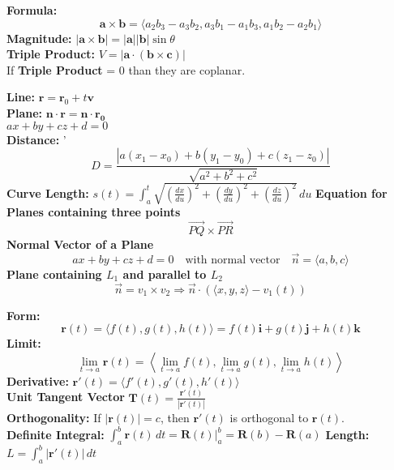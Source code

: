 \documentclass[2pt]{article}
\begin{document}
\begin{multicols}{2}
\begin{tcolorbox}[title=\textbf{Cross Product}, colframe=lightyellow]
\textbf{Formula:}
\[ \mathbf{a} \times \mathbf{b} = \langle a_2b_3 - a_3b_2, a_3b_1 - a_1b_3, a_1b_2 - a_2b_1 \rangle \] 
\textbf{Magnitude:} $|\mathbf{a} \times \mathbf{b}| = |\mathbf{a}| |\mathbf{b}| \sin \theta$ \\
\textbf{Triple Product:} $V = |\mathbf{a} \cdot (\mathbf{b} \times \mathbf{c})|$ \\
If \textbf{Triple Product} = 0 than they are coplanar. 
\end{tcolorbox}

\begin{tcolorbox}[title=\textbf{Lines and Planes}, colframe=lightblue]
    \textbf{Line:} $\mathbf{r} = \mathbf{r}_0 + t \mathbf{v}$ \\
    \textbf{Plane:} $\mathbf{n} \cdot \mathbf{r} = \mathbf{n} \cdot \mathbf{r_0}$ \\
    $ax + by + cz + d = 0$ \\
    \textbf{Distance:}  '
    \[ D = \frac{|a(x_1 - x_0) + b(y_1 - y_0) + c(z_1 - z_0)|}{\sqrt{a^2 + b^2 + c^2}} \]
    \textbf{Curve Length:} $s(t) = \int_{a}^{t} \sqrt{\left(\frac{dx}{du}\right)^2 + \left(\frac{dy}{du}\right)^2 + \left(\frac{dz}{du}\right)^2} \, du$
    \textbf{Equation for Planes containing three points}
    \[ \vec{PQ} \times \vec{PR}\]
    \textbf{Normal Vector of a Plane} 
    \[ ax + by + cz + d = 0 \quad \text{with normal vector} \quad \vec{n} = \langle a, b, c \rangle \]
    \textbf{Plane containing $L_{1}$ and parallel to $L_{2}$} \\
    \[ \vec{n} = v_{1} \times v_{2} \Rightarrow \vec{n} \cdot (\langle x, y, z\rangle  - v_{1}(t))\] 
    

\end{tcolorbox}

\begin{tcolorbox}[title=\textbf{Vector Value Functions}, colframe=lightblue]
    \textbf{Form:} 	 
    \[ \mathbf{r}(t) = \langle f(t), g(t), h(t) \rangle = f(t) \mathbf{i} + g(t) \mathbf{j} + h(t) \mathbf{k} \] 
    \textbf{Limit:} 
    \[ \lim_{t \to a} \mathbf{r}(t) = \left\langle \lim_{t \to a} f(t), \lim_{t \to a} g(t), \lim_{t \to a} h(t) \right\rangle \] 
    \textbf{Derivative:} $\mathbf{r}'(t) = \langle f'(t), g'(t), h'(t) \rangle $ \\
    \textbf{Unit Tangent Vector} $\mathbf{T}(t) = \frac{\mathbf{r}'(t)}{|\mathbf{r}'(t)|}$ \\
    \textbf{Orthogonality:} If \(|\mathbf{r}(t)| = c\), then \(\mathbf{r}'(t)\) is orthogonal to \(\mathbf{r}(t)\). \\
    \textbf{Definite Integral:} $ \int_a^b \mathbf{r}(t) \, dt = \mathbf{R}(t) \Big|_a^b = \mathbf{R}(b) - \mathbf{R}(a) $
    \textbf{Length:} $ L = \int_a^b |\mathbf{r}'(t)| \, dt$
\end{tcolorbox}


\end{multicols}
\end{document}
